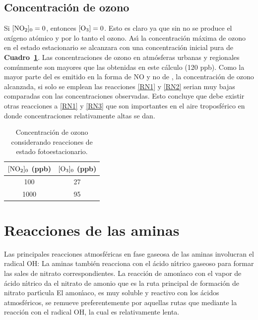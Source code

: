 \subsection{Concentraci\'on de ozono}\label{cozono}
Si $[\ce{NO2}]_0=0$, entonces $[\ce{O3}]=0$. Esto es claro ya que sin  no se produce el ox\'igeno at\'omico y por lo tanto el ozono.  As\'{\i} la concentraci\'on m\'axima de ozono en el estado estacionario se alcanzara con una concentraci\'on inicial pura de  \textbf{Cuadro~\ref{ozono_foto}}. Las concentraciones de ozono en atm\'osferas urbanas y regionales com\'unmente son mayores que las obtenidas en este c\'alculo (120 ppb). Como la mayor parte del   es emitido en la forma de NO y no de  , la concentraci\'on de ozono alcanzada, si solo se emplean las reacciones \ref{RN1} y \ref{RN2} serian muy bajas comparadas con  las concentraciones observadas. Esto concluye que debe existir otras reacciones a \ref{RN1} y \ref{RN3} que son importantes en el aire troposf\'erico en donde concentraciones relativamente altas se dan.
\begin{table}[htp]
\caption[Concentraci\'on de ozono sin COV]{Concentraci\'on de ozono considerando reacciones de estado fotoestacionario.}
\begin{center}
\begin{tabular}{|c|c|}\hline
$[\ce{NO2}]_0$ (ppb) &$[\ce{O3}]_0$ (ppb) \\\hline
100   & 27\\
1000 & 95 \\ \hline
\end{tabular}
\end{center}
\label{ozono_foto}
\end{table}%

\section{Reacciones de las aminas}\label{raminas}
Las principales reacciones atmosf\'ericas en fase gaseosa de las aminas involucran el radical OH:
La aminas tambi\'en reacciona con el \'acido n\'{\i}trico gaseoso para formar las sales de nitrato correspondientes.
La reacci\'on de amon\'{\i}aco con el vapor de \'acido n\'{\i}trico da el nitrato de amonio que es la ruta principal de formaci\'on de nitrato part\'{\i}cula
El amon\'{\i}aco, es muy soluble y reactivo con los \'acidos atmosf\'ericos, se remueve preferentemente por aquellas rutas que mediante la reacci\'on con el radical OH, la cual es relativamente lenta.

